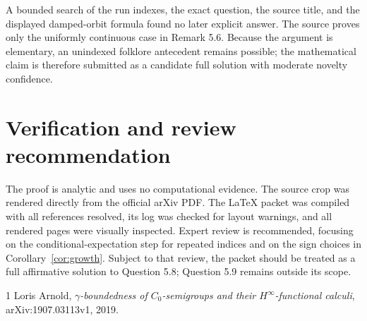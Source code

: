 \documentclass[11pt]{article}
\begin{document}
A bounded search of the run indexes, the exact question, the source title,
and the displayed damped-orbit formula found no later explicit answer.  The
source proves only the uniformly continuous case in Remark 5.6.  Because the
argument is elementary, an unindexed folklore antecedent remains possible;
the mathematical claim is therefore submitted as a candidate full solution
with moderate novelty confidence.

\section{Verification and review recommendation}

The proof is analytic and uses no computational evidence.  The source crop
was rendered directly from the official arXiv PDF.  The LaTeX packet was
compiled with all references resolved, its log was checked for layout
warnings, and all rendered pages were visually inspected.  Expert review is
recommended, focusing on the conditional-expectation step for repeated
indices and on the sign choices in Corollary~\ref{cor:growth}.  Subject to
that review, the packet should be treated as a full affirmative solution to
Question 5.8; Question 5.9 remains outside its scope.

\begin{thebibliography}{1}
Loris Arnold,
\newblock \emph{$\gamma$-boundedness of $C_0$-semigroups and their
$H^\infty$-functional calculi},
\newblock arXiv:1907.03113v1, 2019.
\end{thebibliography}
\end{document}
